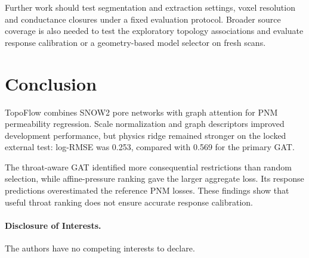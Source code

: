 \documentclass[a4paper]{svproc}
\begin{document}
Further work should test segmentation and extraction settings, voxel resolution and conductance closures under a fixed evaluation protocol. Broader source coverage is also needed to test the exploratory topology associations and evaluate response calibration or a geometry-based model selector on fresh scans.

\section{Conclusion}

TopoFlow combines SNOW2 pore networks with graph attention for PNM permeability regression. Scale normalization and graph descriptors improved development performance, but physics ridge remained stronger on the locked external test: log-RMSE was 0.253, compared with 0.569 for the primary GAT.

The throat-aware GAT identified more consequential restrictions than random selection, while affine-pressure ranking gave the larger aggregate loss. Its response predictions overestimated the reference PNM losses. These findings show that useful throat ranking does not ensure accurate response calibration.

\paragraph*{Disclosure of Interests.} The authors have no competing interests to declare.
\end{document}
